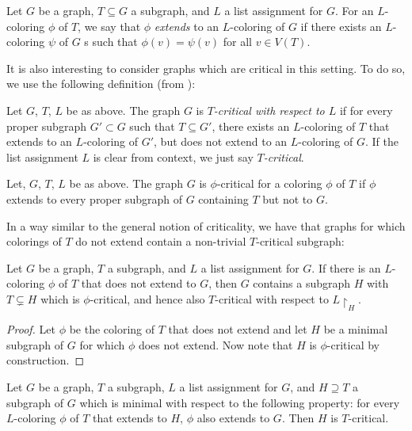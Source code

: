 \begin{definition}[Extending]
	Let $G$ be a graph, $T \subseteq G$ a subgraph, and $L$ a list assignment
	for $G$. For an $L$-coloring $\phi$ of $T$, we say that $\phi$ \emph{extends}
	to an $L$-coloring of $G$ if there exists an $L$-coloring $\psi$ of $G$
s	such that $\phi(v) = \psi(v)$ for all $v \in V(T)$. 
	
\end{definition}

It is also interesting to consider graphs which are critical in this setting. To do so, we use the following definition (from \cite{fivelistcoloring2}):

\begin{definition}[$T$-critical]
	Let $G$, $T$, $L$ be as above. The graph $G$ is \emph{$T$-critical with respect to $L$} if for every proper subgraph $G' \subset G$ such that $T \subseteq G'$, there exists an $L$-coloring of $T$ that extends to an $L$-coloring of $G'$, but does not extend to an $L$-coloring of $G$. If the list assignment $L$ is clear from context, we just say \emph{$T$-critical}.
\end{definition}

\begin{definition}
	Let, $G$, $T$, $L$ be as above. The graph $G$ is $\phi$-critical for a coloring $\phi$ of $T$ if $\phi$ extends to every proper subgraph of $G$ containing $T$ but not to $G$.
\end{definition}

In a way similar to the general notion of criticality, we have that graphs for which colorings of $T$ do not extend contain a non-trivial $T$-critical subgraph:

\begin{lemma}
Let $G$ be a graph, $T$ a subgraph, and $L$ a list assignment for $G$. If there 
is an $L$-coloring $\phi$ of $T$ that does not extend to $G$, 
then $G$ contains a subgraph $H$ with $T \subsetneq H$ which 
is $\phi$-critical, and hence also $T$-critical with respect 
to $L\restriction_H$. 
\end{lemma}

\begin{proof}
Let $\phi$ be the coloring of $T$ that does not extend and let $H$ be a minimal subgraph 
of $G$ for which $\phi$ does not extend. Now note that $H$ is $\phi$-critical 
by construction.
\end{proof}

\begin{lemma}
\label{minimalsubgraphlemma}
Let $G$ be a graph, $T$ a subgraph, $L$ a list assignment for $G$, and $H \supseteq T$ 
a subgraph of $G$ which is minimal with respect to the following property: 
for every $L$-coloring $\phi$ of $T$ that extends to $H$, $\phi$ also extends to $G$. 
Then $H$ is $T$-critical.
\end{lemma}

